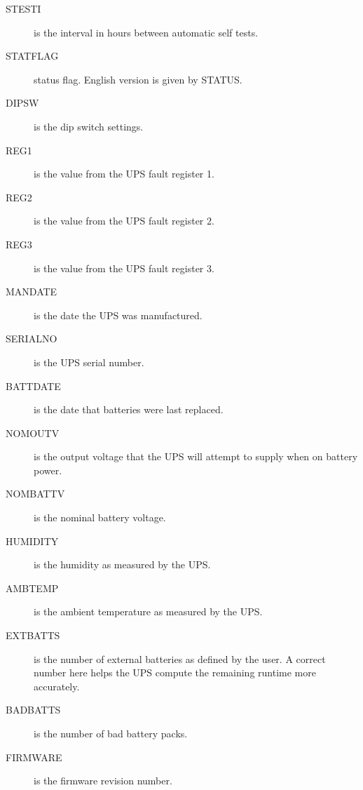 {{{{{{{{\begin{description}
\item [STESTI]
   is the interval in hours between automatic self tests.  

\item [STATFLAG]
   status flag. English version is given by STATUS.  

\item [DIPSW]
   is the dip switch settings.  

\item [REG1]
   is the value from the UPS fault register 1.  

\item [REG2]
   is the value from the UPS fault register 2.  

\item [REG3]
   is the value from the UPS fault register 3.  

\item [MANDATE]
   is the date the UPS was manufactured.  

\item [SERIALNO]
   is the UPS serial number.  

\item [BATTDATE]
   is the date that batteries were last replaced.  

\item [NOMOUTV]
   is the output voltage that the UPS will attempt to supply when on battery
power.  

\item [NOMBATTV]
   is the nominal battery voltage.  

\item [HUMIDITY]
   is the humidity as measured by the UPS.  

\item [AMBTEMP]
   is the ambient temperature as measured by the UPS.  

\item [EXTBATTS]
   is the number of external batteries as defined by the user. A correct number
here helps the UPS compute the remaining runtime more accurately.  

\item [BADBATTS]
   is the number of bad battery packs.  

\item [FIRMWARE]
   is the firmware revision number.  


\end{description}}}}}}}}}
